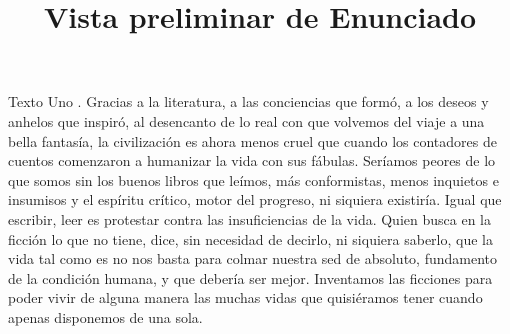 \documentclass[a4paper,12pt]{article}\usepackage[spanish]{babel}\usepackage{times}
\title{Vista preliminar de Enunciado}
\begin{document}
\twocolumn 

\maketitle

Texto Uno . Gracias a la literatura, a las conciencias que formó, a los deseos y anhelos que inspiró, al desencanto de lo real con que volvemos del viaje a una bella fantasía, la civilización es ahora menos cruel que cuando los contadores de cuentos comenzaron a humanizar la vida con sus fábulas. Seríamos peores de lo que somos sin los buenos libros que leímos, más conformistas, menos inquietos e insumisos y el espíritu crítico, motor del progreso, ni siquiera existiría. Igual que escribir, leer es protestar contra las insuficiencias de la vida. Quien busca en la ficción lo que no tiene, dice, sin necesidad de decirlo, ni siquiera saberlo, que la vida tal como es no nos basta para colmar nuestra sed de absoluto, fundamento de la condición humana, y que debería ser mejor. Inventamos las ficciones para poder vivir de alguna manera las muchas vidas que quisiéramos tener cuando apenas disponemos de una sola.\newline
\end{document}

